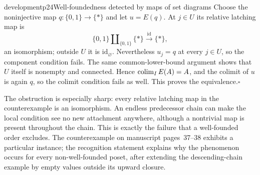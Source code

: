 \begin{dcomment}{development}{p24}{Well-foundedness detected by maps of set diagrams}
Choose the noninjective map $q:\{0,1\}\to\{*\}$ and let $u=E(q)$. At $j\in U$ its relative latching map is
\[
 \{0,1\}\amalg_{\{0,1\}}\{*\}
       \xrightarrow{\mathrm{id}}\{*\},
\]
an isomorphism; outside $U$ it is $\mathrm{id}_{\varnothing}$. Nevertheless $u_j=q$ at every $j\in U$, so the component condition fails. The same common-lower-bound argument shows that $U$ itself is nonempty and connected. Hence $\mathop{\rm colim}_I E(A)=A$, and the colimit of $u$ is again $q$, so the colimit condition fails as well. This proves the equivalence.\hfill$\square$

The obstruction is especially sharp: every relative latching map in the counterexample is an isomorphism. An endless predecessor chain can make the local condition see no new attachment anywhere, although a nontrivial map is present throughout the chain. This is exactly the failure that a well-founded order excludes. The counterexample on manuscript pages~37--38 exhibits a particular instance; the recognition statement explains why the phenomenon occurs for every non-well-founded poset, after extending the descending-chain example by empty values outside its upward closure.
\end{dcomment}

